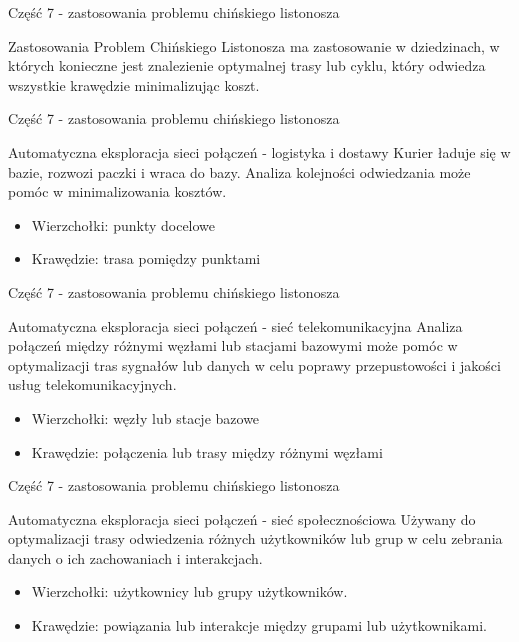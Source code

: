 \documentclass[polish,envcountsect,10pt]{beamer}
\begin{document}
\begin{frame}{Część 7 - zastosowania problemu chińskiego listonosza}
    \begin{block}{Zastosowania}
        Problem Chińskiego Listonosza ma zastosowanie w dziedzinach, w których konieczne jest znalezienie
        optymalnej trasy lub cyklu, który odwiedza wszystkie krawędzie minimalizując koszt.
    \end{block}
\end{frame}

\begin{frame}{Część 7 - zastosowania problemu chińskiego listonosza}
    \begin{block}{Automatyczna eksploracja sieci połączeń - logistyka i dostawy}
        Kurier ładuje się w bazie, rozwozi paczki i wraca do bazy.
        Analiza kolejności odwiedzania może pomóc w minimalizowania kosztów.
        \begin{itemize}
            \item Wierzchołki: punkty docelowe
            \item Krawędzie: trasa pomiędzy punktami
        \end{itemize}
    \end{block}
\end{frame}

\begin{frame}{Część 7 - zastosowania problemu chińskiego listonosza}
    \begin{block}{Automatyczna eksploracja sieci połączeń - sieć telekomunikacyjna}
        Analiza połączeń między różnymi węzłami lub stacjami bazowymi może pomóc w optymalizacji tras sygnałów lub danych w celu poprawy przepustowości i jakości usług telekomunikacyjnych.
        \begin{itemize}
            \item Wierzchołki: węzły lub stacje bazowe
            \item Krawędzie: połączenia lub trasy między różnymi węzłami
        \end{itemize}
    \end{block}
\end{frame}

\begin{frame}{Część 7 - zastosowania problemu chińskiego listonosza}
    \begin{block}{Automatyczna eksploracja sieci połączeń - sieć społecznościowa}
        Używany do optymalizacji trasy odwiedzenia różnych użytkowników lub grup w celu zebrania danych o ich zachowaniach i interakcjach.
        \begin{itemize}
            \item Wierzchołki: użytkownicy lub grupy użytkowników.
            \item Krawędzie: powiązania lub interakcje między grupami lub użytkownikami.
        \end{itemize}
    \end{block}
\end{frame}
\end{document}
